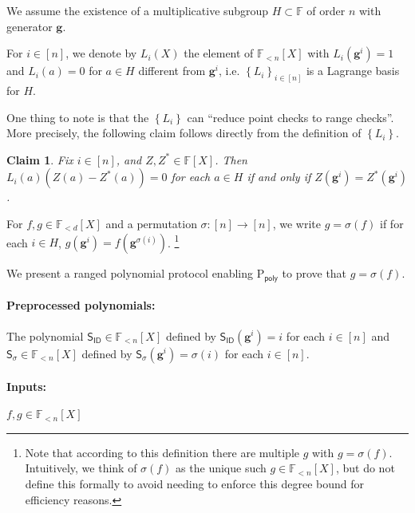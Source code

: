 \documentclass[11pt]{article} %
\newcommand{\F}{\ensuremath{\mathbb F}\xspace}
\newcommand{\sigof}[1]{\ensuremath{\sigma(#1)}\xspace}
\newcommand{\dom}{\ensuremath{H}\xspace}
\newcommand{\sett}[2]{\ensuremath{\set{#1}_{#2}}\xspace}
\newcommand{\prvpoly}{\ensuremath{\mathrm{P_{\mathsf{poly}}}}\xspace}
\newcommand{\set}[1]{\ensuremath{\left\{#1\right\}}\xspace}
\newcommand{\hgen}{\ensuremath{\mathbf{g}}\xspace}
\newcommand{\polysofdeg}[1]{\ensuremath{\F_{< #1}[X]}\xspace}
\newcommand{\sigpoly}{\ensuremath{\mathsf{S_{\sigma}}}\xspace}
\newcommand{\idpoly}{\ensuremath{\mathsf{S_{ID}}}\xspace}
\newtheorem{claim}[lemma]{Claim}
\begin{document}
 
We assume the existence of a multiplicative subgroup $H\subset \F$ of order $n$ with generator \hgen.


For $i\in [n]$, we denote by $L_i(X)$ the element of \polysofdeg{n} with $L_i(\hgen^i)=1$ and $L_i(a)=0$ for $a\in H$ different from  $\hgen^i$, i.e. \sett{L_i}{i\in [n]} is a Lagrange basis for $H$.

One thing to note is that the \set{L_i} can ``reduce point checks to range checks''.
More precisely, the following claim follows directly from the definition of \set{L_i}.
\begin{claim}\label{clm:pointcheck}
 Fix $i\in [n]$, and $Z,Z^*\in \F[X]$. Then $L_i(a) (Z(a)-Z^*(a)) =0$ for each $a\in \dom$ if and only if 
 $Z(\hgen^i) = Z^*(\hgen^i)$.
\end{claim}




For $f,g\in \polysofdeg{d}$ and a permutation $\sigma :[n]\to [n]$,
we write $g=\sigma(f)$ if for each $i\in \dom$, $g(\hgen^i) = f(\hgen^{\sigma(i)})$. \footnote{Note that according to this definition there are multiple $g$ with $g=\sigma(f)$. Intuitively, we think of \sigof{f} as the unique such $g\in \polysofdeg{n}$, but do not define this formally to avoid needing to enforce this degree bound for efficiency reasons.}

We present a ranged polynomial protocol enabling \prvpoly to prove that
$g=\sigof{f}$.

\paragraph{Preprocessed polynomials:}
The polynomial $\idpoly\in \polysofdeg{n}$ defined by 
$\idpoly(\hgen^i) = i$ for each $i\in [n]$ and $\sigpoly \in \polysofdeg{n}$ defined by
$\sigpoly(\hgen^i) = \sigma(i)$ for each $i\in [n]$.
\paragraph{Inputs:}
$f,g\in \polysofdeg{n}$
\end{document}
